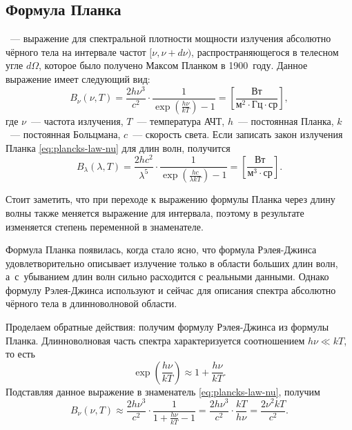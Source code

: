 \subsection{Формула Планка}
\label{sec:planck-law}
~--- выражение для спектральной плотности мощности излучения
 абсолютно чёрного тела на интервале частот $[\nu, \nu + d \nu)$,
 распространяющегося в телесном угле $d\Omega$, которое было получено Максом
 Планком в 1900~году. Данное выражение имеет следующий вид:
\begin{equation}
	B_\nu(\nu,T) 
	= \frac{2h\nu^3}{c^2}\cdot \frac{1}{\exp\left(\frac{h\nu}{kT}\right)-1} 
	= \left[ \frac{\text{Вт}}{\text{м}^2 \cdot \text{Гц} \cdot \text{ср}}\right],
	\label{eq:plancks-law-nu}
\end{equation}
где $\nu$~--- частота излучения, $T$~--- температура АЧТ, $h$~--- постоянная
 Планка, $k$~--- постоянная Больцмана, $c$~--- скорость света. Если записать закон
 излучения Планка \eqref{eq:plancks-law-nu} для длин волн, получится
\begin{equation}
	B_\lambda(\lambda,T)
	= \frac{2hc^2}{\lambda^5} \cdot \frac{1}{\exp\left(\frac{hc}{\lambda kT}\right)-1} 
	= \left[ \frac{\text{Вт}}{\text{м}^3 \cdot \text{ср}}\right].
	\label{eq:plancks-law-lambda}
\end{equation}

Стоит заметить, что при переходе к выражению формулы Планка через длину
 волны также меняется выражение для интервала, поэтому в результате 
 изменяется степень переменной в знаменателе.

Формула Планка появилась, когда стало ясно, что формула Рэлея-Джинса
 удовлетворительно описывает излучение только в области больших длин волн,
 а~с~убыванием длин волн сильно расходится с реальными данными. Однако формулу
 Рэлея-Джинса используют и сейчас для описания спектра абсолютно чёрного тела 
 в длинноволновой области.


Проделаем обратные действия: получим формулу Рэлея-Джинса из формулы Планка. Длинноволновая часть спектра характеризуется соотношением $h\nu \ll kT$, то есть
\begin{equation*}
	\exp\left( \frac{h\nu}{kT}\right) \approx 1 + \frac{h\nu}{kT}.
\end{equation*}
Подставляя данное выражение в знаменатель \eqref{eq:plancks-law-nu}, получим
\begin{equation*}
	B_\nu(\nu,T) 
	\approx \frac{2h\nu^3}{c^2}\cdot \frac{1}{1 + \frac{h\nu}{kT} - 1} 
	= \frac{2h\nu^3 }{c^2}\cdot \frac{k T}{ h \nu} 
	= \frac{2 \nu^2 k T}{c^2}.
\end{equation*}

